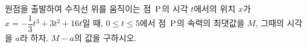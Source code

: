 원점을 출발하여 수직선 위를 움직이는 점~$\mathrm{P}$의 시각 $t$에서의 위치 $x$가 $x=-\dfrac{1}{3}t^3+3t^2+16t$일 때, $0\le t\le 5$에서 점~$\mathrm{P}$의 속력의 최댓값을 $M$, 그때의 시각을 $a$라 하자. $M-a$의 값을 구하시오.
